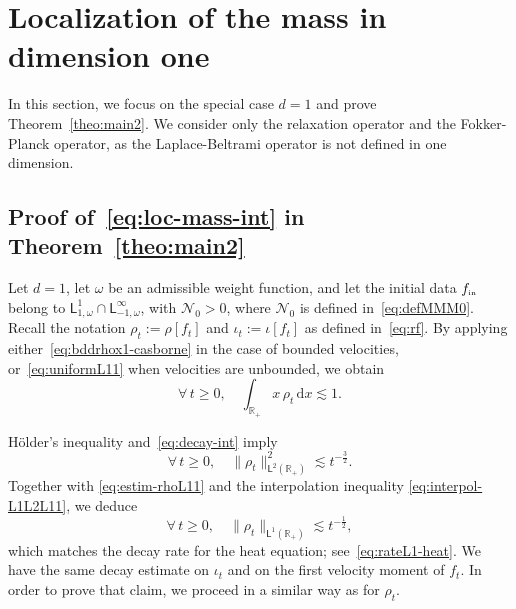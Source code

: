 \documentclass[11pt]{amsart}
\theoremstyle{definition}
\theoremstyle{remark}
\numberwithin{equation}{section}
\newcommand\R{{\mathbb R}}
\newcommand{\dd}{{\, \mathrm d}}
\newcommand{\init}{\text{{\tiny {\rm in}}}}
\newcommand{\sfL}{\mathsf{L}}
\begin{document}
\section{Localization of the mass in dimension one}
\label{sec:loc-mass}

In this section, we focus on the special case $d=1$ and prove Theorem~\ref{theo:main2}. We consider only the relaxation operator and the Fokker-Planck operator, as the Laplace-Beltrami operator is not defined in one dimension.
 
 \subsection{Proof of~\eqref{eq:loc-mass-int} in Theorem~\ref{theo:main2}}
\label{subsec:loc-mass-relax}

Let $d=1$, let $\omega$ be an admissible weight function, and let the initial data $f_{\init}$ belong to $\sfL^{1}_{1,\omega} \cap \sfL^{\infty}_{-1,\omega}$, with $\mathcal{N}_0 > 0$, where $\mathcal{N}_0$ is defined in~\eqref{eq:defMMM0}.
Recall the notation $\rho_t := \rho[f_t]$ and $\iota_t := \iota[f_t]$ as defined in~\eqref{eq:rf}. By applying either~\eqref{eq:bddrhox1-casborne} in the case of bounded velocities, or~\eqref{eq:uniformL11} when velocities are unbounded, we obtain
\begin{equation}
  \label{eq:estim-rhoL11}
  \forall\, t \ge 0, \quad \int_{\R_+} x\, \rho_t \dd x \lesssim 1.
\end{equation}
 
Hölder's inequality and~\eqref{eq:decay-int} imply 
\begin{equation}
  \label{eq:estim-kinetic-rho}
  \forall\, t \ge 0, \quad   \| \rho_t \|_{\sfL^{2}(\mathbb{R}_+)}^2  \lesssim  t^{-\frac{3}{2}}.
\end{equation}
Together with \eqref{eq:estim-rhoL11} and the interpolation inequality  \eqref{eq:interpol-L1L2L11}, we deduce 
\begin{equation}
  \label{eq:rho-L1decay-kinetic}
  \forall \, t \ge 0, \quad \| \rho_t \|_{\sfL^{1}(\R_+)} \lesssim  t^{-\frac{1}{2}},
\end{equation}
which matches the decay rate for the heat equation; see~\eqref{eq:rateL1-heat}. We have the same decay estimate on $\iota_t$ and on the first velocity moment of $f_t$. 
In order to prove that claim, we proceed in a similar way as for $\rho_t$. 
\end{document}

